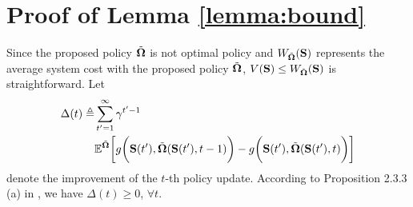 

\section{ Proof of Lemma \ref{lemma:bound} }
\label{append_3}
 Since the proposed policy $\tilde{\boldsymbol{\Omega}}$ is not optimal policy and $W_{\tilde{\boldsymbol{\Omega}}}(\mathbf{S})$ represents the average system cost with the proposed policy $\tilde{\boldsymbol{\Omega}}$, $V(\mathbf{S}) \leq W_{\tilde{\boldsymbol{\Omega}}}(\mathbf{S})$ is straightforward.
Let 
{\small
\begin{align*}
    \Delta(t) \triangleq &
    \sum_{t'=1}^{\infty} \gamma^{t'-1}\\\nonumber
    &\mathbb{E}^{ \tilde{\boldsymbol{\Omega}} } \bigg[
        g\bigg(\mathbf{S}(t'), \tilde{\boldsymbol{\Omega}}(\mathbf{S}(t'),t-1)\bigg)
        -  g\bigg(\mathbf{S}(t'), \tilde{\boldsymbol{\Omega}}(\mathbf{S}(t'),t)\bigg)
    \bigg]
\end{align*}
}
denote the improvement of the $t$-th policy update.
According to Proposition 2.3.3 (a) in \cite{dp-control}, we have $\Delta(t)\geq 0$, $\forall t$.

